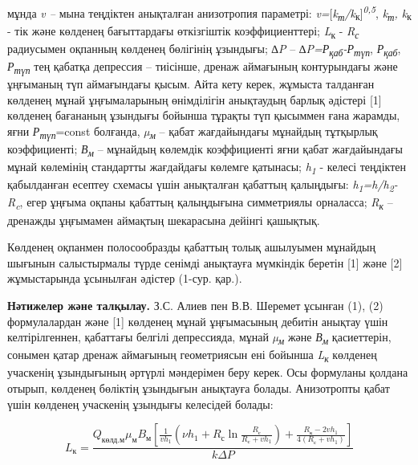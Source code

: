     \begin{multicols}{2}

мұнда \emph{v --} мына теңдіктен анықталған анизотропия параметрі:
\emph{v=}{[}\emph{k\textsubscript{т}/k}\textsubscript{к}{]}\emph{\textsuperscript{0,5}},
\emph{k\textsubscript{т}, k}\textsubscript{к} - тік және көлденең
бағыттардағы өткізгіштік коэффициенттері; \emph{L}\textsubscript{к} -
\emph{R\textsubscript{с}} радиусымен оқпанның көлденең бөлігінің
ұзындығы; \emph{∆P} --
\emph{∆P=Р\textsubscript{қаб}-Р\textsubscript{түп}},
\emph{Р\textsubscript{қаб}}, \emph{Р\textsubscript{түп}} тең қабатқа
депрессия -- тиісінше, дренаж аймағының контурындағы және ұңғыманың түп
аймағындағы қысым. Айта кету керек, жұмыста талданған көлденең мұнай
ұңғымаларының өнімділігін анықтаудың барлық әдістері {[}1{]} көлденең
бағананың ұзындығы бойынша тұрақты түп қысыммен ғана жарамды, яғни
\emph{Р\textsubscript{түп}}=const болғанда, \emph{µ\textsubscript{м}} --
қабат жағдайындағы мұнайдың тұтқырлық коэффициенті;
\emph{В\textsubscript{м}} -- мұнайдың көлемдік коэффициенті яғни қабат
жағдайындағы мұнай көлемінің стандартты жағдайдағы көлемге қатынасы;
\emph{h\textsubscript{1}} - келесі теңдіктен қабылданған есептеу схемасы
үшін анықталған қабаттың қалыңдығы:
\emph{h\textsubscript{1}=h/h\textsubscript{2}-R\textsubscript{c}}, егер
ұңғыма оқпаны қабаттың қалыңдығына симметриялы орналасса;
\emph{R\textsubscript{к}} -- дренажды ұңғымамен аймақтың шекарасына
дейінгі қашықтық.

Көлденең оқпанмен полосообразды қабаттың толық ашылуымен мұнайдың
шығынын салыстырмалы түрде сенімді анықтауға мүмкіндік беретін {[}1{]}
және {[}2{]} жұмыстарында ұсынылған әдістер (1-сур. қар.).

{\bfseries Нәтижелер және талқылау.} З.С. Алиев пен В.В. Шеремет ұсынған
(1), (2) формулалардан және {[}1{]} көлденең мұнай ұңғымасының дебитін
анықтау үшін келтірілгеннен, қабаттағы белгілі депрессияда, мұнай
\emph{µ\textsubscript{м}} және \emph{В\textsubscript{м}} қасиеттерін,
сонымен қатар дренаж аймағының геометриясын ені бойынша
\emph{L\textsubscript{к}} көлденең учаскенің ұзындығының әртүрлі
мәндерімен беру керек. Осы формуланы қолдана отырып, көлденең бөліктің
ұзындығын анықтауға болады. Анизотропты қабат үшін көлденең учаскенің
ұзындығы келесідей болады:

\end{multicols}
\begin{equation}
    L_{\text{к}} = \frac{Q_{\text{көлд.м}} \mu_{\text{м}} B_{\text{м}} \left[ \frac{1}{v h_1} \left( \nu h_1 + R_{\text{с}} \ln \frac{R_{\text{с}}}{R_{\text{с}} + v h_1} \right) + \frac{R_{\text{к}} - 2v h_1}{4 (R_{\text{с}} + v h_1)} \right]}{k \Delta P}
    \end{equation}
    
